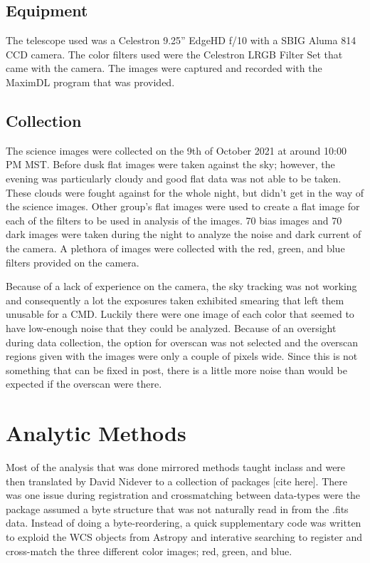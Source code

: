 \documentclass[twoside,11pt]{article}
\begin{document}
\subsection{Equipment}
The telescope used was a Celestron 9.25'' EdgeHD f/10 with a SBIG Aluma 814 CCD camera. The color filters used were the Celestron LRGB Filter Set that came with the camera. The images were captured and recorded with the MaximDL program that was provided.

\subsection{Collection}
The science images were collected on the 9th of October 2021 at around 10:00 PM MST. Before dusk flat images were taken against the sky; however, the evening was particularly cloudy and good flat data was not able to be taken. These clouds were fought against for the whole night, but didn't get in the way of the science images. Other group's flat images were used to create a flat image for each of the filters to be used in analysis of the images. 70 bias images and 70 dark images were taken during the night to analyze the noise and dark current of the camera. A plethora of images were collected with the red, green, and blue filters provided on the camera.

Because of a lack of experience on the camera, the sky tracking was not working and consequently a lot the exposures taken exhibited smearing that left them unusable for a CMD. Luckily there were one image of each color that seemed to have low-enough noise that they could be analyzed. Because of an oversight during data collection, the option for overscan was not selected and the overscan regions given with the images were only a couple of pixels wide. Since this is not something that can be fixed in post, there is a little more noise than would be expected if the overscan were there. 

\section{Analytic Methods}
Most of the analysis that was done mirrored methods taught inclass and were then translated by David Nidever to a collection of packages [cite here]. There was one issue during registration and crossmatching between data-types were the package assumed a byte structure that was not naturally read in from the .fits data. Instead of doing a byte-reordering, a quick supplementary code was written to exploid the WCS objects from Astropy and interative searching to register and cross-match the three different color images; red, green, and blue. 
\end{document}

